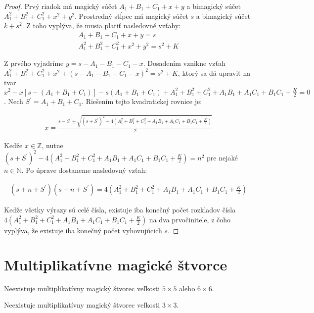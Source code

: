 \begin{proof} Prvý riadok má magický súčet $A_1 + B_1 + C_1 + x + y$ a bimagický súčet $A_1^2 + B_1^2 + C_1^2 + x^2 + y^2$. Prostredný stĺpec má magický súčet $s$ a bimagický súčet $k + s^2$. Z toho vyplýva, že musia platiť nasledovné vzťahy:
\begin{gather}
A_1 + B_1 + C_1 + x + y = s \\
A_1^2 + B_1^2 + C_1^2 + x^2 + y^2 = s^2 + K
\end{gather}

Z prvého vyjadríme $y = s - A_1 - B_1 - C_1 - x$. Dosadením vznikne vzťah $A_1^2 + B_1^2 + C_1^2 + x^2 + (s - A_1 - B_1 - C_1 - x)^2 = s^2 + K$, ktorý sa dá upraviť na tvar $x^2 - x[s - (A_1 + B_1 + C_1)] - s(A_1 + B_1 + C_1) + A_1^2 + B_1^2 + C_1^2 + A_1 B_1 + A_1 C_1 + B_1 C_1 + \frac{K}{2} = 0$. Nech $S^\prime = A_1 + B_1 + C_1$. Riešením tejto kvadratickej rovnice je:

\begin{gather}
x = \frac{s - S^\prime \pm \sqrt{(s + S^\prime)^2 - 4(A_1^2 + B_1^2 + C_1^2 + A_1 B_1 + A_1 C_1 + B_1 C_1 + \frac{K}{2})}}{2}
\end{gather}

Keďže $x \in \mathbb{Z}$, nutne $(s + S^\prime)^2 - 4(A_1^2 + B_1^2 + C_1^2 + A_1 B_1 + A_1 C_1 + B_1 C_1 + \frac{K}{2}) = n^2$ pre nejaké $n \in \mathbb{N}$. Po úprave dostaneme nasledovný vzťah:

\begin{gather}
(s + n + S^\prime)(s - n + S^\prime) = 4(A_1^2 + B_1^2 + C_1^2 + A_1 B_1 + A_1 C_1 + B_1 C_1 + \frac{K}{2})
\end{gather}

Keďže všetky výrazy sú celé čísla, existuje iba konečný počet rozkladov čísla $4(A_1^2 + B_1^2 + C_1^2 + A_1 B_1 + A_1 C_1 + B_1 C_1 + \frac{K}{2})$ na dva prvočinitele, z čoho vyplýva, že existuje iba konečný počet vyhovujúcich $s$.
\end{proof} 

\section{Multiplikatívne magické štvorce}

\begin{hypothesis} Neexistuje multiplikatívny magický štvorec veľkosti $5 \times 5$ alebo $6 \times 6$.
\end{hypothesis} 

\begin{theorem} Neexistuje multiplikatívny magický štvorec veľkosti $3 \times 3$.
\end{theorem}

